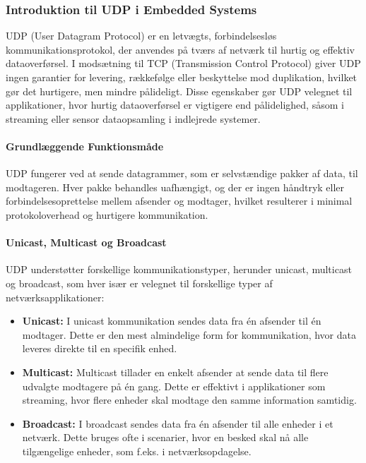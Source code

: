 \documentclass[12pt,a4paper]{book}
\begin{document}
	\subsubsection*{Introduktion til UDP i Embedded Systems}
	UDP (User Datagram Protocol) er en letvægts, forbindelsesløs kommunikationsprotokol, der anvendes på tværs af netværk til hurtig og effektiv dataoverførsel. I modsætning til TCP (Transmission Control Protocol) giver UDP ingen garantier for levering, rækkefølge eller beskyttelse mod duplikation, hvilket gør det hurtigere, men mindre pålideligt. Disse egenskaber gør UDP velegnet til applikationer, hvor hurtig dataoverførsel er vigtigere end pålidelighed, såsom i streaming eller sensor dataopsamling i indlejrede systemer.
	
	\paragraph{Grundlæggende Funktionsmåde}
	UDP fungerer ved at sende datagrammer, som er selvstændige pakker af data, til modtageren. Hver pakke behandles uafhængigt, og der er ingen håndtryk eller forbindelsesoprettelse mellem afsender og modtager, hvilket resulterer i minimal protokoloverhead og hurtigere kommunikation.
	
	\paragraph{Unicast, Multicast og Broadcast}
	UDP understøtter forskellige kommunikationstyper, herunder unicast, multicast og broadcast, som hver især er velegnet til forskellige typer af netværksapplikationer:
	
	\begin{itemize}
		\item \textbf{Unicast:} I unicast kommunikation sendes data fra én afsender til én modtager. Dette er den mest almindelige form for kommunikation, hvor data leveres direkte til en specifik enhed.
		\item \textbf{Multicast:} Multicast tillader en enkelt afsender at sende data til flere udvalgte modtagere på én gang. Dette er effektivt i applikationer som streaming, hvor flere enheder skal modtage den samme information samtidig.
		\item \textbf{Broadcast:} I broadcast sendes data fra én afsender til alle enheder i et netværk. Dette bruges ofte i scenarier, hvor en besked skal nå alle tilgængelige enheder, som f.eks. i netværksopdagelse.
	\end{itemize}
	
\end{document}
